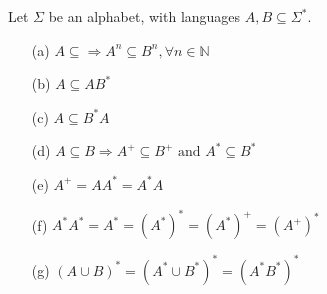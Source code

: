 \documentclass[11pt]{article}
\begin{document}
    Let \(\Sigma\) be an alphabet, with languages \(A,B \subseteq \Sigma^*\). 
    \begin{enumerate}
        \item[(a)] \(A \subseteq \Rightarrow A^n \subseteq B^n, \forall n \in \mathbb{N}\)
        \item[(b)] \(A \subseteq AB^*\)
        \item[(c)] \(A \subseteq B^*A\)
        \item[(d)] \(A \subseteq B \Rightarrow A^+ \subseteq B^+ \text{ and } A^* \subseteq B^*\)   
        \item[(e)] \(A^+ = AA^* = A^*A\)
        \item[(f)] \(A^* A^* = A^* = (A^*)^* = (A^*)^+ = (A^+)^*\)
        \item[(g)] \((A \cup B)^* = (A^* \cup B^*)^* = (A^* B^*)^*\)    
    \end{enumerate}
\end{document}
